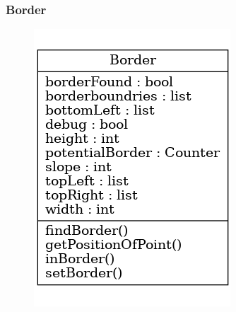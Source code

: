 \documentclass[12pt]{article}
\begin{document}
\subsubsection{Border}
\begin{figure}[ht!]
\centering
\includegraphics{border.png}
\end{figure}

\end{document}
